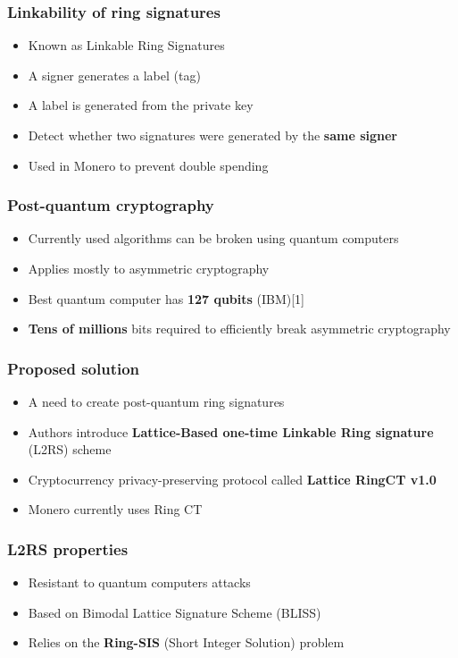 \documentclass[%
  14pt,       				%
	c,                  %
	aspectratio=1610,   %
	unicode,						%
]{beamer}				    	%
\begin{document}
\begin{frame} 
  \frametitle{Linkability of ring signatures}
  \large{
    \begin{itemize}
      \item Known as Linkable Ring Signatures
      \item A signer generates a label (tag)
      \item A label is generated from the private key
      \item Detect whether two signatures were generated by the \textbf{same signer}
      \item Used in Monero to prevent double spending
    \end{itemize}
  }
\end{frame}

\begin{frame} 
  \frametitle{Post-quantum cryptography}
  \large{
    \begin{itemize}
      \item Currently used algorithms can be broken using quantum computers
      \item Applies mostly to asymmetric cryptography
      \item Best quantum computer has \textbf{127 qubits} (IBM)[1]
      \item \textbf{Tens of millions} bits required to efficiently break asymmetric cryptography
    \end{itemize}
  }
\end{frame}

\begin{frame}
  \frametitle{Proposed solution}
  \large{
    \begin{itemize}
      \item A need to create post-quantum ring signatures
      \item Authors introduce \textbf{Lattice-Based one-time Linkable Ring signature} (L2RS) scheme
      \item Cryptocurrency privacy-preserving protocol called \textbf{Lattice RingCT v1.0}
      \item Monero currently uses Ring CT
    \end{itemize}
  }
\end{frame}

\begin{frame}
  \frametitle{L2RS properties}
  \large{
    \begin{itemize}
			\item Resistant to quantum computers attacks
      \item Based on Bimodal Lattice Signature Scheme (BLISS)
      \item Relies on the \textbf{Ring-SIS} (Short Integer Solution) problem
    \end{itemize}
  }
\end{frame}
\end{document}
